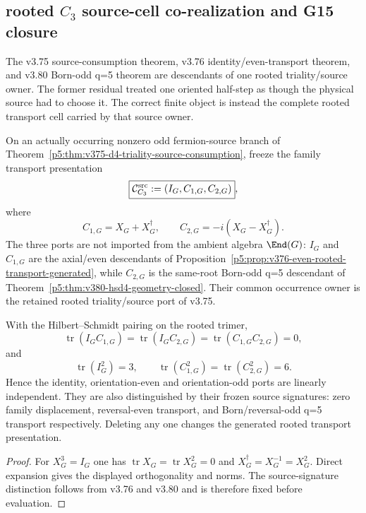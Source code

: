\documentclass[12pt,a4paper]{article}
\begin{document}
\subsection{rooted \texorpdfstring{$C_3$}{C3} source-cell co-realization and G15 closure}
\label{p5:sec:v381-c3-source-cell}

The v3.75 source-consumption theorem, v3.76 identity/even-transport theorem,
and v3.80 Born-odd q=5 theorem are descendants of one rooted triality/source
owner.  The former residual treated one oriented half-step as though the
physical source had to choose it.  The correct finite object is instead the
complete rooted transport cell carried by that source owner.

\begin{definition}
\label{p5:def:v381-c3-source-cell}
On an actually occurring nonzero odd fermion-source branch of
Theorem~\ref{p5:thm:v375-d4-triality-source-consumption}, freeze the family
transport presentation
\[
 \boxed{\mathcal C_{C_3}^{\rm src}:=(I_G,C_{1,G},C_{2,G})},
\]
where
\[
 C_{1,G}=X_G+X_G^\dagger,
 \qquad
 C_{2,G}=-i(X_G-X_G^\dagger).
\]
The three ports are not imported from the ambient algebra
\(\End(G)\): \(I_G\) and \(C_{1,G}\) are the axial/even descendants of
Proposition~\ref{p5:prop:v376-even-rooted-transport-generated}, while
\(C_{2,G}\) is the same-root Born-odd q=5 descendant of
Theorem~\ref{p5:thm:v380-hsd4-geometry-closed}.  Their common occurrence
owner is the retained rooted triality/source port of v3.75.
\end{definition}

\begin{lemma}
\label{p5:lem:v381-c3-source-cell-nonredundant}
With the Hilbert--Schmidt pairing on the rooted trimer,
\[
 \operatorname{tr}(I_GC_{1,G})=
 \operatorname{tr}(I_GC_{2,G})=
 \operatorname{tr}(C_{1,G}C_{2,G})=0,
\]
and
\[
 \operatorname{tr}(I_G^2)=3,
 \qquad
 \operatorname{tr}(C_{1,G}^2)=
 \operatorname{tr}(C_{2,G}^2)=6.
\]
Hence the identity, orientation-even and orientation-odd ports are linearly
independent.  They are also distinguished by their frozen source signatures:
zero family displacement, reversal-even transport, and Born/reversal-odd
q=5 transport respectively.  Deleting any one changes the generated rooted
transport presentation.
\end{lemma}
\begin{proof}
For \(X_G^3=I_G\) one has
\(\operatorname{tr}X_G=\operatorname{tr}X_G^2=0\) and
\(X_G^\dagger=X_G^{-1}=X_G^2\).  Direct expansion gives the displayed
orthogonality and norms.  The source-signature distinction follows from
v3.76 and v3.80 and is therefore fixed before evaluation.
\end{proof}
\end{document}

